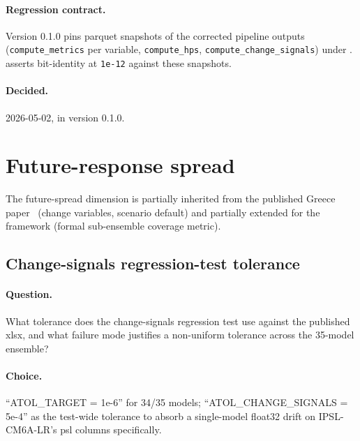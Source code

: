 \documentclass[11pt,a4paper]{article}
\begin{document}
\paragraph{Regression contract.}
Version 0.1.0 pins parquet snapshots of the corrected pipeline outputs
(\texttt{compute\_metrics} per variable, \texttt{compute\_hps},
\texttt{compute\_change\_signals}) under
.
 asserts bit-identity at
\texttt{1e-12} against these snapshots.

\paragraph{Decided.} 2026-05-02, in version 0.1.0.

\section{Future-response spread}\label{sec:spread}

The future-spread dimension is partially inherited from the published Greece
paper~\citep{tsilimigkras2026subselection} (change variables, scenario
default) and partially extended for the framework (formal sub-ensemble
coverage metric).


\subsection{Change-signals regression-test tolerance}\label{sec:spread-tolerance}

\paragraph{Question.} What tolerance does the change-signals regression test
use against the published xlsx, and what failure mode justifies a
non-uniform tolerance across the 35-model ensemble?

\paragraph{Choice.} ``ATOL\_TARGET = 1e-6'' for 34/35 models;
``ATOL\_CHANGE\_SIGNALS = 5e-4'' as the test-wide tolerance to absorb a
single-model float32 drift on IPSL-CM6A-LR's psl columns specifically.
\end{document}
